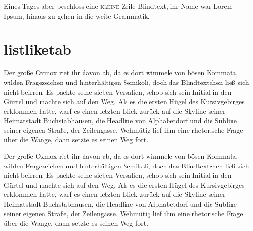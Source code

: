 \documentclass[%
	12pt,%
	a4paper,%
	oneside,%
	listof=totoc,
 	index=totoc,
	bibliography = totoc,
	parskip = half,%
	chapterprefix=false,%
	appendixprefix, %
headings=small,%
]{scrreprt}
\begin{document}
Eines Tages aber beschloss eine \textsc{kleine} Zeile Blindtext, ihr Name war Lorem Ipsum, hinaus zu gehen in die weite Grammatik.


\chapter{listliketab}
Der große Oxmox riet ihr davon ab, da es dort wimmele von bösen Kommata, wilden Fragezeichen und hinterhältigen Semikoli, doch das Blindtextchen ließ sich nicht beirren. Es packte seine sieben Versalien, schob sich sein Initial in den Gürtel und machte sich auf den Weg. Als es die ersten Hügel des Kursivgebirges erklommen hatte, warf es einen letzten Blick zurück auf die Skyline seiner Heimatstadt Buchstabhausen, die Headline von Alphabetdorf und die Subline seiner eigenen Straße, der Zeilengasse. Wehmütig lief ihm eine rhetorische Frage über die Wange, dann setzte es seinen Weg fort.

Der große Oxmox riet ihr davon ab, da es dort wimmele von bösen Kommata, wilden Fragezeichen und hinterhältigen Semikoli, doch das Blindtextchen ließ sich nicht beirren. Es packte seine sieben Versalien, schob sich sein Initial in den Gürtel und machte sich auf den Weg. Als es die ersten Hügel des Kursivgebirges erklommen hatte, warf es einen letzten Blick zurück auf die Skyline seiner Heimatstadt Buchstabhausen, die Headline von Alphabetdorf und die Subline seiner eigenen Straße, der Zeilengasse. Wehmütig lief ihm eine rhetorische Frage über die Wange, dann setzte es seinen Weg fort.
\end{document}
